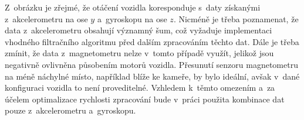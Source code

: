 Z~obrázku je zřejmé, že otáčení vozidla koresponduje s~daty získanými
z~akcelerometru na ose $y$ a~gyroskopu na ose $z$. Nicméně je třeba poznamenat, 
že data z~akcelerometru obsahují významný šum, což vyžaduje implementaci vhodného
filtračního algoritmu před dalším zpracováním těchto dat. Dále je třeba zmínit, 
že data z~magnetometru nelze v~tomto případě využít, jelikož jsou negativně 
ovlivněna působením motorů vozidla. Přesunutí senzoru magnetometru na méně náchylné 
místo, například blíže ke kameře, by bylo ideální, avšak v~dané konfiguraci vozidla 
to není proveditelné. Vzhledem k~těmto omezením a~za účelem optimalizace rychlosti 
zpracování bude v~práci použita kombinace dat pouze z~akcelerometru a~gyroskopu.

\endinput